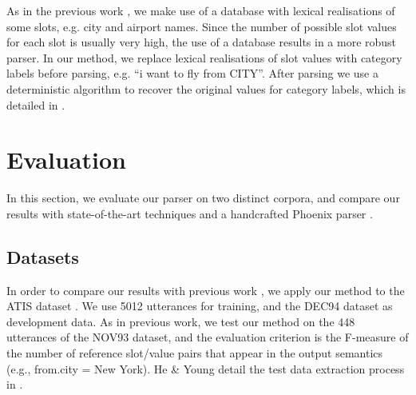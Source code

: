 \documentclass{article}
\begin{document}
As in the previous work \cite{mairesse09,he05,zettlemoyer07,meza08b}, we make use of a database with lexical realisations of some slots, e.g. city and airport names. Since the number of possible slot values for each slot is usually very high, the use of a database results in a more robust parser. In our method, we replace lexical realisations of slot values with category labels before parsing, e.g. ``i want to fly from CITY''. 
After parsing we use a deterministic algorithm to recover the original values for category labels, which is detailed in \cite{mairesse09}.



\section{Evaluation} \label{sec:evaluation}

In this section, we evaluate our parser on two distinct corpora, and compare our results with state-of-the-art techniques and a handcrafted Phoenix parser \cite{ward91}. 

\subsection{Datasets} \label{sec:dataset}

In order to compare our results with previous work \cite{mairesse09, he05,zettlemoyer07,meza08b},
we apply our method to the ATIS  dataset \cite{atis94}. 
We use 5012 utterances for training, and the DEC94 dataset as development data. As in previous work, we test our method on the 448 utterances of the NOV93 dataset, and the evaluation criterion is the F-measure of the number of reference slot/value pairs that appear in the output semantics (e.g., from.city = New York). He \& Young detail the test data extraction process in \cite{he05}.
\end{document}
